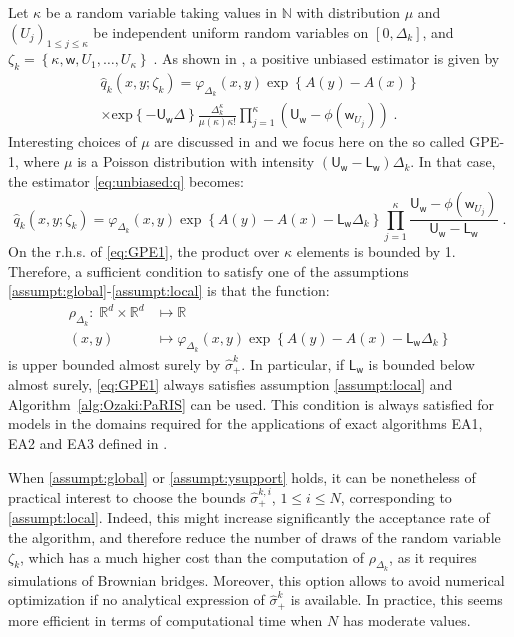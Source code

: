 \documentclass[12pt]{article}
\newcommand{\eqsp}{\;}
\newcommand{\1}{\mathrm{1}}
\newcommand{\mw}{\mathsf{w}}%
\newcommand{\U}{\mathsf{U}}
\newcommand{\Lo}{\mathsf{L}}
\begin{document}
Let $\kappa$ be a random variable taking values in $\mathbb{N}$ with distribution $\mu$ and $(U_j)_{1\le j\le \kappa}$ be independent uniform random variables on $[0,\Delta_k]$, and $
\zeta_k = \left\{\kappa,\mw,U_1,\ldots,U_\kappa\right\}\eqsp$. 
As shown in \cite{fearnhead:papaspiliopoulos:roberts:2008}, a positive unbiased estimator is given by 
\begin{multline}
\widehat{q}_k(x,y;\zeta_k) = \varphi_{\Delta_k}(x,y) \exp \left\{A(y) - A(x)\right\}\\ 
\times\mathrm{exp}\left\{-\U_\mw\Delta\right\}\frac{\Delta_k^{\kappa}}{\mu(\kappa)\kappa!}\prod_{j=1}^{\kappa}\left(\U_\mw-\phi(\mw_{U_j})\right)\eqsp.\label{eq:unbiased:q}
\end{multline}
Interesting choices of $\mu$ are discussed in \cite{fearnhead:papaspiliopoulos:roberts:2008} and we focus here on the so called GPE-1, where $\mu$ is a Poisson distribution with intensity $(\U_\mw-\Lo_\mw)\Delta_k$. 
In that case, the estimator \eqref{eq:unbiased:q} becomes:
\begin{equation}
\widehat{q}_{k}(x,y;\zeta_k) = \varphi_{\Delta_k}(x,y) \exp \left\{A(y) - A(x)- \Lo_\mw\Delta_k \right\}\prod_{j=1}^{\kappa}\frac{\U_\mw-\phi(\mw_{U_j})}{\U_\mw-\Lo_\mw}\eqsp.\label{eq:GPE1}
\end{equation}
On the r.h.s. of \eqref{eq:GPE1}, the product over $\kappa$ elements is bounded by 1.
 Therefore, a sufficient condition to satisfy one of the assumptions \eqref{assumpt:global}-\eqref{assumpt:local} is that the function:
\begin{align*}
\rho_{\Delta_k}:\eqsp\mathbb{R}^d\times \mathbb{R}^d &\mapsto \mathbb{R}\nonumber\\
(x,y)&\mapsto \varphi_{\Delta_k}(x,y) \exp \left\{A(y) - A(x)- \Lo_\mw\Delta_k \right\}
\end{align*}
is upper bounded almost surely by $\hat{\sigma}^k_+$.
In particular, if $\Lo_\mw$ is bounded below almost surely, \eqref{eq:GPE1} always satisfies assumption \eqref{assumpt:local} and Algorithm~\ref{alg:Ozaki:PaRIS} can be used. 
This condition is always satisfied for models in the domains required for the applications of  exact algorithms EA1, EA2 and EA3 defined in \cite{beskos:papaspiliopoulos:roberts:fearnhead:2006}.

When \eqref{assumpt:global} or \eqref{assumpt:ysupport} holds, it can be nonetheless of practical interest to choose the bounds $\hat{\sigma}^{k,i}_+$, $1\le i \le N$, corresponding to \eqref{assumpt:local}. 
Indeed, this might increase significantly the acceptance rate of the algorithm, and therefore reduce the number of draws of the random variable $\zeta_k$, which has a much higher cost than the computation of $\rho_{\Delta_k}$, as it requires simulations of Brownian bridges. 
Moreover, this option allows to avoid numerical optimization if no analytical expression of $\hat{\sigma}_+^k$ is available.  In practice, this seems more efficient in terms of computational time when $N$ has moderate values. 
\end{document}
